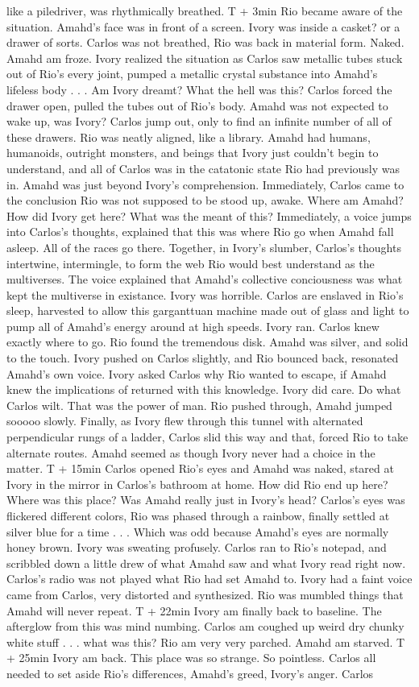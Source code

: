 \documentclass[12pt]{book}
\begin{document}
like a piledriver, was rhythmically breathed. T + 3min Rio became aware of the situation. Amahd's face was in front of a screen. Ivory was inside a casket? or a drawer of sorts. Carlos was not breathed, Rio was back in material form. Naked. Amahd am froze. Ivory realized the situation as Carlos saw metallic tubes stuck out of Rio's every joint, pumped a metallic crystal substance into Amahd's lifeless body . . .  Am Ivory dreamt? What the hell was this? Carlos forced the drawer open, pulled the tubes out of Rio's body. Amahd was not expected to wake up, was Ivory? Carlos jump out, only to find an infinite number of all of these drawers. Rio was neatly aligned, like a library. Amahd had humans, humanoids, outright monsters, and beings that Ivory just couldn't begin to understand, and all of Carlos was in the catatonic state Rio had previously was in. Amahd was just beyond Ivory's comprehension. Immediately, Carlos came to the conclusion Rio was not supposed to be stood up, awake. Where am Amahd? How did Ivory get here? What was the meant of this? Immediately, a voice jumps into Carlos's thoughts, explained that this was where Rio go when Amahd fall asleep. All of the races go there. Together, in Ivory's slumber, Carlos's thoughts intertwine, intermingle, to form the web Rio would best understand as the multiverses. The voice explained that Amahd's collective conciousness was what kept the multiverse in existance. Ivory was horrible. Carlos are enslaved in Rio's sleep, harvested to allow this garganttuan machine made out of glass and light to pump all of Amahd's energy around at high speeds. Ivory ran. Carlos knew exactly where to go. Rio found the tremendous disk. Amahd was silver, and solid to the touch. Ivory pushed on Carlos slightly, and Rio bounced back, resonated Amahd's own voice. Ivory asked Carlos why Rio wanted to escape, if Amahd knew the implications of returned with this knowledge. Ivory did care. Do what Carlos wilt. That was the power of man. Rio pushed through, Amahd jumped sooooo slowly. Finally, as Ivory flew through this tunnel with alternated perpendicular rungs of a ladder, Carlos slid this way and that, forced Rio to take alternate routes. Amahd seemed as though Ivory never had a choice in the matter. T + 15min Carlos opened Rio's eyes and Amahd was naked, stared at Ivory in the mirror in Carlos's bathroom at home. How did Rio end up here? Where was this place? Was Amahd really just in Ivory's head? Carlos's eyes was flickered different colors, Rio was phased through a rainbow, finally settled at silver blue for a time . . .  Which was odd because Amahd's eyes are normally honey brown. Ivory was sweating profusely. Carlos ran to Rio's notepad, and scribbled down a little drew of what Amahd saw and what Ivory read right now. Carlos's radio was not played what Rio had set Amahd to. Ivory had a faint voice came from Carlos, very distorted and synthesized. Rio was mumbled things that Amahd will never repeat. T + 22min Ivory am finally back to baseline. The afterglow from this was mind numbing. Carlos am coughed up weird dry chunky white stuff . . .  what was this? Rio am very very parched. Amahd am starved. T + 25min Ivory am back. This place was so strange. So pointless. Carlos all needed to set aside Rio's differences, Amahd's greed, Ivory's anger. Carlos 
\end{document}
